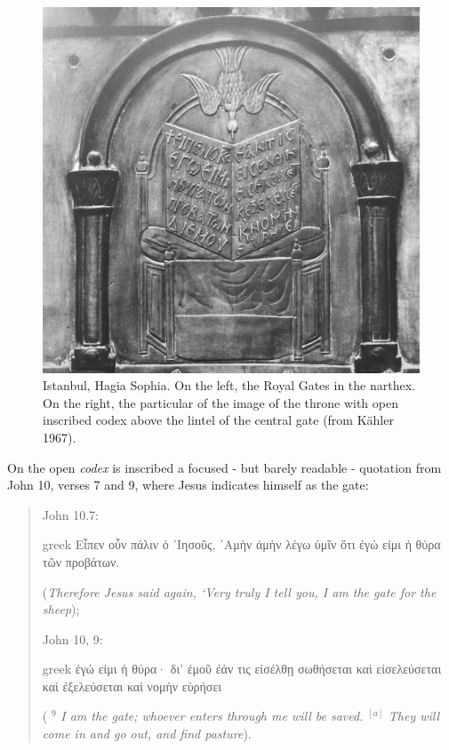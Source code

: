 \documentclass[amsthm,ebook]{saparticle}
\begin{document}
\begin{figure}[!hbp]
\begin{minipage}[c]{0.57\textwidth}
 \includegraphics[width=\columnwidth]{FelleVisualFeaturesofinscriptionsEAGLE2016FullPaper-img013.jpg}
\end{minipage}
\caption{Istanbul, Hagia Sophia. On the left, the Royal Gates in the narthex. On the right, the particular of the image
of the throne with open inscribed codex above the lintel of the central gate (from Kähler 1967).}
\label{fig:9}
\end{figure}


\newpage
On the open \emph{codex} is inscribed a focused - but barely readable - quotation from John 10, verses 7 and 9, where Jesus
indicates himself as the gate: 




\begin{quotation}
John 10.7: \begin{otherlanguage*}{greek}
Εἶπεν οὖν πάλιν ὁ ᾿Ιησοῦς, ᾿Αμὴν ἀμὴν λέγω ὑμῖν ὅτι ἐγώ εἰμι ἡ θύρα τῶν προβάτων.
\end{otherlanguage*} (\emph{Therefore Jesus said again, ‘Very truly I tell you, I am the gate for the sheep}); 

John 10, 9: \begin{otherlanguage*}{greek}
ἐγώ εἰμι ἡ θύρα· δι' ἐμοῦ ἐάν τις εἰσέλθῃ σωθήσεται καὶ εἰσελεύσεται καὶ ἐξελεύσεται καὶ νομὴν εὑρήσει
\end{otherlanguage*}  ( $^\textit{9}$ \emph{I am the gate;
whoever enters through me will be saved.} $^{[a]}$ \emph{They will come in and go out, and find pasture}).

\end{quotation}
\end{document}
